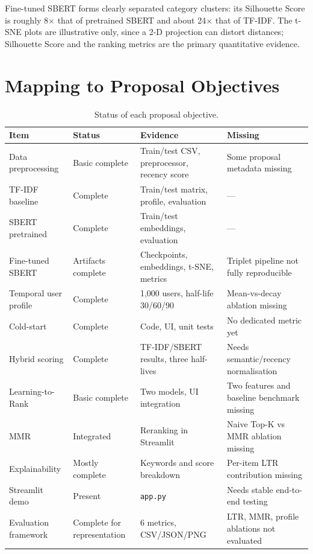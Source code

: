 \documentclass[12pt,a4paper]{article}
\begin{document}
Fine-tuned SBERT forms clearly separated category clusters: its Silhouette
Score is roughly 8$\times$ that of pretrained SBERT and about 24$\times$ that of
TF-IDF. The t-SNE plots are illustrative only, since a 2-D projection can
distort distances; Silhouette Score and the ranking metrics are the primary
quantitative evidence.

\section{Mapping to Proposal Objectives}

\begin{table}[H]
\centering
\caption{Status of each proposal objective.}\label{tab:status}
\small
\begin{tabular}{p{3.1cm}p{2.4cm}p{4.2cm}p{4.0cm}}
\toprule
\textbf{Item} & \textbf{Status} & \textbf{Evidence} & \textbf{Missing}\\
\midrule
Data preprocessing & Basic complete & Train/test CSV, preprocessor, recency score & Some proposal metadata missing\\
TF-IDF baseline & Complete & Train/test matrix, profile, evaluation & ---\\
SBERT pretrained & Complete & Train/test embeddings, evaluation & ---\\
Fine-tuned SBERT & Artifacts complete & Checkpoints, embeddings, t-SNE, metrics & Triplet pipeline not fully reproducible\\
Temporal user profile & Complete & 1{,}000 users, half-life 30/60/90 & Mean-vs-decay ablation missing\\
Cold-start & Complete & Code, UI, unit tests & No dedicated metric yet\\
Hybrid scoring & Complete & TF-IDF/SBERT results, three half-lives & Needs semantic/recency normalisation\\
Learning-to-Rank & Basic complete & Two models, UI integration & Two features and baseline benchmark missing\\
MMR & Integrated & Reranking in Streamlit & Naive Top-K vs MMR ablation missing\\
Explainability & Mostly complete & Keywords and score breakdown & Per-item LTR contribution missing\\
Streamlit demo & Present & \texttt{app.py} & Needs stable end-to-end testing\\
Evaluation framework & Complete for representation & 6 metrics, CSV/JSON/PNG & LTR, MMR, profile ablations not evaluated\\
\bottomrule
\end{tabular}
\end{table}
\end{document}
